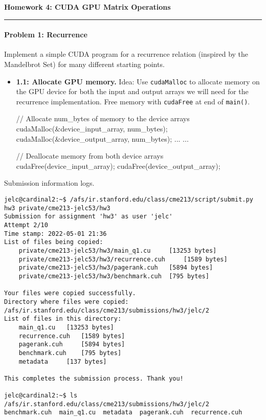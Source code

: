 \documentclass[12pt,letterpaper,twoside]{article}
\begin{document}
{\centering \textbf{Homework 4: CUDA GPU Matrix Operations\\}}
\vspace*{-8pt}\noindent\rule{\linewidth}{1pt}

\paragraph{Problem 1: Recurrence } Implement a simple CUDA program for 
a recurrence relation (inspired by the Mandelbrot Set) for many 
different starting points.

\begin{itemize}
    \item \textbf{1.1: Allocate GPU memory.} Idea: Use \texttt{cudaMalloc}
    to allocate memory on the GPU device for both the input and output 
    arrays we will need for the recurrence implementation. Free memory 
    with \texttt{cudaFree} at end of \texttt{main()}.

\begin{cpp}
// Allocate num_bytes of memory to the device arrays
cudaMalloc(&device_input_array, num_bytes);
cudaMalloc(&device_output_array, num_bytes);
...
...

// Deallocate memory from both device arrays
cudaFree(device_input_array);
cudaFree(device_output_array);
\end{cpp}

\end{itemize}

Submission information logs.
\begin{verbatim}
jelc@cardinal2:~$ /afs/ir.stanford.edu/class/cme213/script/submit.py hw3 private/cme213-jelc53/hw3
Submission for assignment 'hw3' as user 'jelc'
Attempt 2/10
Time stamp: 2022-05-01 21:36
List of files being copied:
    private/cme213-jelc53/hw3/main_q1.cu	 [13253 bytes]
    private/cme213-jelc53/hw3/recurrence.cuh	 [1589 bytes]
    private/cme213-jelc53/hw3/pagerank.cuh	 [5894 bytes]
    private/cme213-jelc53/hw3/benchmark.cuh	 [795 bytes]

Your files were copied successfully.
Directory where files were copied: /afs/ir.stanford.edu/class/cme213/submissions/hw3/jelc/2
List of files in this directory:
    main_q1.cu	 [13253 bytes]
    recurrence.cuh	 [1589 bytes]
    pagerank.cuh	 [5894 bytes]
    benchmark.cuh	 [795 bytes]
    metadata	 [137 bytes]

This completes the submission process. Thank you!
    
jelc@cardinal2:~$ ls /afs/ir.stanford.edu/class/cme213/submissions/hw3/jelc/2
benchmark.cuh  main_q1.cu  metadata  pagerank.cuh  recurrence.cuh
\end{verbatim}
\end{document}
